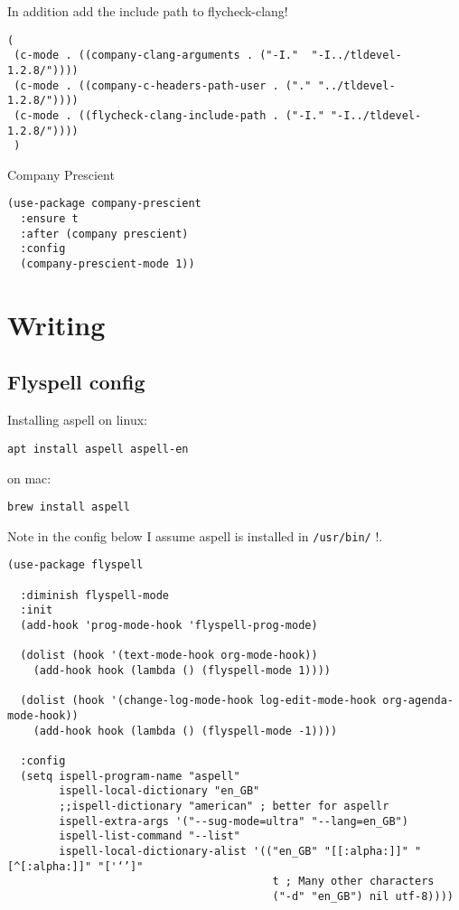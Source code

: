 \documentclass[12pt]{article}
\begin{document}
In addition add the include path to flycheck-clang! 

\begin{verbatim}
(
 (c-mode . ((company-clang-arguments . ("-I."  "-I../tldevel-1.2.8/"))))
 (c-mode . ((company-c-headers-path-user . ("." "../tldevel-1.2.8/"))))
 (c-mode . ((flycheck-clang-include-path . ("-I." "-I../tldevel-1.2.8/"))))
 )

\end{verbatim}
Company Prescient 
\begin{verbatim}
(use-package company-prescient
  :ensure t
  :after (company prescient)
  :config
  (company-prescient-mode 1))

\end{verbatim}

\section{Writing}
\label{sec:orgc4dcbac}

\subsection{Flyspell config}
\label{sec:org2395797}

Installing aspell on linux:

\begin{verbatim}
apt install aspell aspell-en
\end{verbatim}

on mac: 

\begin{verbatim}
brew install aspell 
\end{verbatim}

Note in the config below I assume aspell is installed in \texttt{/usr/bin/} !. 

\begin{verbatim}
(use-package flyspell

  :diminish flyspell-mode
  :init
  (add-hook 'prog-mode-hook 'flyspell-prog-mode)

  (dolist (hook '(text-mode-hook org-mode-hook))
    (add-hook hook (lambda () (flyspell-mode 1))))

  (dolist (hook '(change-log-mode-hook log-edit-mode-hook org-agenda-mode-hook))
    (add-hook hook (lambda () (flyspell-mode -1))))

  :config
  (setq ispell-program-name "aspell"
        ispell-local-dictionary "en_GB"
        ;;ispell-dictionary "american" ; better for aspellr
        ispell-extra-args '("--sug-mode=ultra" "--lang=en_GB")
        ispell-list-command "--list"
        ispell-local-dictionary-alist '(("en_GB" "[[:alpha:]]" "[^[:alpha:]]" "['‘’]"
                                         t ; Many other characters
                                         ("-d" "en_GB") nil utf-8))))

\end{verbatim}
\end{document}
